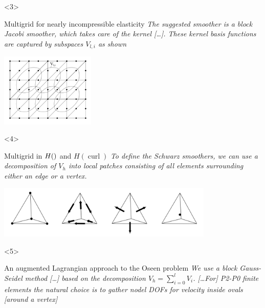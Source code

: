 \documentclass[presentation,aspectratio=43, 10pt]{beamer}
\let\div\relax
\DeclareMathOperator{\div}{div}
\DeclareMathOperator{\curl}{curl}
\begin{document}
\begin{frame}[t]
  \begin{onlyenv}<3>
    \begin{block}{Multigrid for nearly incompressible elasticity}
      \emph{The suggested smoother is a block Jacobi smoother, which takes
      care of the kernel [\dots]. These kernel basis functions are
      captured by subspaces $V_{l,i}$ as shown}
      \begin{center}
        \includegraphics[height=3.5cm]{schoeberl}
      \end{center}
      \begin{flushright}
        \textcite{Schoeberl:1999} \hspace{4em}
      \end{flushright}
    \end{block}
  \end{onlyenv}

  \begin{onlyenv}<4>
    \begin{block}{Multigrid in $H(\div)$ and $H(\curl)$}
      \emph{To define the Schwarz smoothers, we can use a decomposition of
      $V_h$ into local patches consisting of all elements surrounding
      either an edge or a vertex.}

      \begin{center}
        \includegraphics[height=2.5cm]{arnold}
      \end{center}
      \begin{flushright}
        \textcite{Arnold:2000} \hspace{4em}
      \end{flushright}
    \end{block}
  \end{onlyenv}

  \begin{onlyenv}<5>
    \begin{block}{An augmented Lagrangian approach to the Oseen problem}
      \emph{We use a block Gauss-Seidel method [\dots] based on the
      decomposition $V_h = \sum_{i=0}^l V_i$. [\dots For] P2-P0 finite
      elements the natural choice is to gather nodel DOFs for velocity
      inside ovals [around a vertex]}


\end{block}
\end{onlyenv}
\end{frame}
\end{document}
